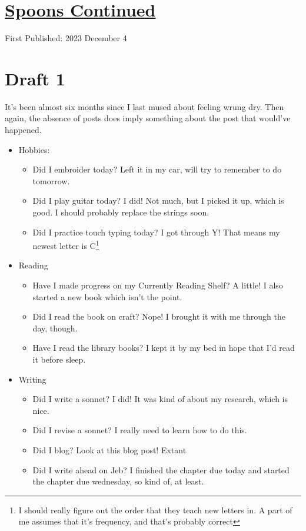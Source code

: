 \documentclass[12pt]{article}[titlepage]
\newcommand{\1}{\={a}}
\newcommand{\2}{\={e}}
\newcommand{\3}{\={\i}}
\newcommand{\4}{\=o}
\newcommand{\5}{\=u}
\newcommand{\6}{\={A}}
\renewcommand{\,}{\textsuperscript{,}}
\begin{document}
\doublespacing
\section{\href{spoons-3.html}{Spoons Continued}}
First Published: 2023 December 4

\section{Draft 1}
It's been almost six months since I last mused about feeling wrung dry.
Then again, the absence of posts does imply something about the post that would've happened.

\begin{itemize}
\item Hobbies:
\begin{itemize}
\item Did I embroider today? Left it in my car, will try to remember to do tomorrow.
\item Did I play guitar today? I did! Not much, but I picked it up, which is good. I should probably replace the strings soon.
\item Did I practice touch typing today? I got through Y! That means my newest letter is C\footnote{I should really figure out the order that they teach new letters in. A part of me assumes that it's frequency, and that's probably correct}
\end{itemize}
\item Reading
\begin{itemize}
\item Have I made progress on my Currently Reading Shelf? A little! I also started a new book which isn't the point.
\item Did I read the book on craft? Nope! I brought it with me through the day, though.
\item Have I read the library books? I kept it by my bed in hope that I'd read it before sleep.
\end{itemize}
\item Writing
\begin{itemize}
\item Did I write a sonnet? I did! It was kind of about my research, which is nice.
\item Did I revise a sonnet? I really need to learn how to do this.
\item Did I blog? Look at this blog post! Extant
\item Did I write ahead on Jeb? I finished the chapter due today and started the chapter due wednesday, so kind of, at least.

\end{itemize}
\end{itemize}
\end{document}
